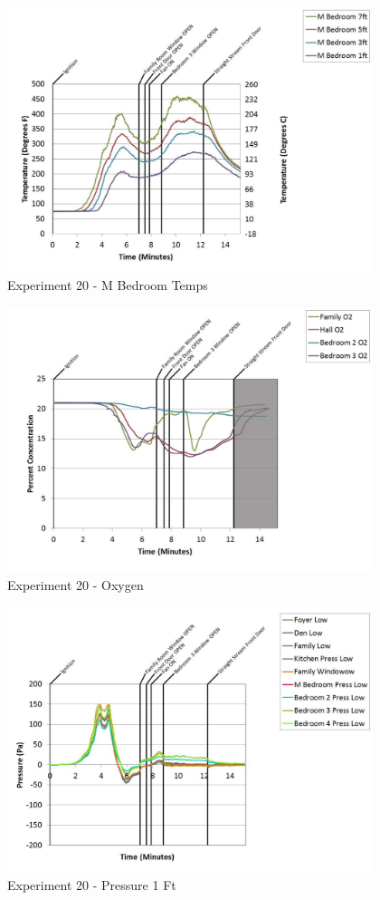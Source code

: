 \documentclass{article}
\begin{document}
\begin{appendices}
	\clearpage

	\begin{figure}[h!]
		\centering
		\includegraphics[height=3.05in]{0_Images/Results_Charts/Exp_20_Charts/MBedroomTemps.pdf}
		\caption{Experiment 20 - M Bedroom Temps}
	\end{figure}
 

	\begin{figure}[h!]
		\centering
		\includegraphics[height=3.05in]{0_Images/Results_Charts/Exp_20_Charts/Oxygen.pdf}
		\caption{Experiment 20 - Oxygen}
	\end{figure}
 
	\clearpage

	\begin{figure}[h!]
		\centering
		\includegraphics[height=3.05in]{0_Images/Results_Charts/Exp_20_Charts/Pressure1Ft.pdf}
		\caption{Experiment 20 - Pressure 1 Ft}
	\end{figure}
 


\end{appendices}
\end{document}
